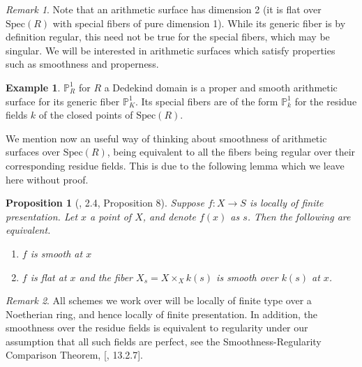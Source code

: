 \documentclass{article}
\theoremstyle{definition}
\newtheorem{example}[theorem]{Example}
\theoremstyle{remark}
\newtheorem*{remark}{Remark}
\theoremstyle{plain}
\newtheorem{proposition}[theorem]{Proposition}
\newcommand{\mb}[1]{\mathbb{#1}}
\begin{document}
\begin{remark}
	Note that an arithmetic surface has dimension 2 (it is flat over $\text{Spec}(R)$ with special fibers of pure dimension 1). 
	While its generic fiber is by definition regular, this need not be true for the special fibers, which may be singular.
	We will be interested in arithmetic surfaces which satisfy properties such as smoothness and properness.
\end{remark}

\begin{example}
	$\mb{P}^1_R$ for $R$ a Dedekind domain is a proper and smooth arithmetic surface for its generic fiber $\mb{P}^1_K$.
	Its special fibers are of the form $\mb{P}^1_k$ for the residue fields $k$ of the closed points of $\text{Spec}(R)$.
\end{example}

We mention now an useful way of thinking about smoothness of arithmetic surfaces over $\text{Spec}(R)$, being equivalent to all the fibers being regular over their corresponding residue fields.
This is due to the following lemma which we leave here without proof.

\begin{proposition}[\cite{BLR}, 2.4, Proposition 8]\label{smoothness-lemma}
	Suppose $f: X \to S$ is locally of finite presentation. 
	Let $x$ a point of $X$, and denote $f(x)$ as $s$.
	Then the following are equivalent.
\begin{enumerate}
	\item $f$ is smooth at $x$
	\item $f$ is flat at $x$ and the fiber $X_s = X \times_X k(s)$ is smooth over $k(s)$ at $x$.
\end{enumerate}

\end{proposition}

\begin{remark}
All schemes we work over will be locally of finite type over a Noetherian ring, and hence locally of finite presentation.
In addition, the smoothness over the residue fields is equivalent to regularity under our assumption that all such fields are perfect, see the Smoothness-Regularity Comparison Theorem, [\cite{FOAG}, 13.2.7].
\end{remark}
\end{document}

